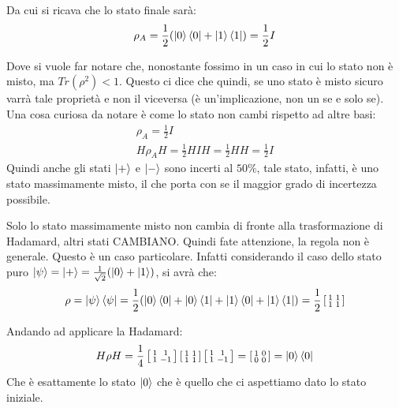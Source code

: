 Da cui si ricava che lo stato finale sarà:
\begin{gather*}
\rho_A = \frac{1}{2}(\ket{0}\bra{0} + \ket{1}\bra{1}) = \frac{1}{2}I
\end{gather*}

Dove si vuole far notare che, nonostante fossimo in un caso in cui lo stato non è misto, ma \(Tr(\rho^2)<1\). Questo ci dice che quindi, se uno stato è misto sicuro varrà tale proprietà e non il viceversa (è un'implicazione, non un se e solo se). Una cosa curiosa da notare è come lo stato non cambi rispetto ad altre basi:
\begin{gather*}
       \rho_A = \frac{1}{2} I\\
       H \rho_A H = \frac{1}{2}HIH = \frac{1}{2}HH
       =\frac{1}{2}I
\end{gather*}
Quindi anche gli stati \(\ket{+}\) e \(\ket{-}\) sono incerti al \(50\%\), tale stato, infatti, è uno stato massimamente misto, il che porta con se il maggior grado di incertezza possibile.

\begin{warn}
Solo lo stato massimamente misto non cambia di fronte alla trasformazione di Hadamard, altri stati CAMBIANO. Quindi fate attenzione, la regola non è generale. Questo è un caso particolare. Infatti considerando il caso dello stato puro \(\ket{\psi} = \ket{+} = \frac{1}{\sqrt{2}}(\ket{0} + \ket{1})\), si avrà che:
\begin{gather*}
\rho = \ket{\psi}\bra{\psi} = \frac{1}{2}(\ket{0}\bra{0} + \ket{0}\bra{1} + \ket{1}\bra{0} + \ket{1}\bra{1})= \frac{1}{2}\left[\begin{smallmatrix}
1 & 1\\
1 & 1
\end{smallmatrix}\right]
\end{gather*}

Andando ad applicare la Hadamard:
\begin{gather*}
H \rho H = \frac{1}{4}
\left[\begin{smallmatrix}
1 & 1 \\
1 & -1       
\end{smallmatrix}\right]
\left[\begin{smallmatrix}
1 & 1 \\
1 & 1       
\end{smallmatrix}\right]
\left[\begin{smallmatrix}
1 & 1 \\
1 & -1       
\end{smallmatrix}\right]=
\left[\begin{smallmatrix}
1 & 0 \\
0 & 0       
\end{smallmatrix}\right]=
\ket{0}\bra{0}
\end{gather*}
Che è esattamente lo stato \(\ket{0}\) che è quello che ci aspettiamo dato lo stato iniziale.
\end{warn}


